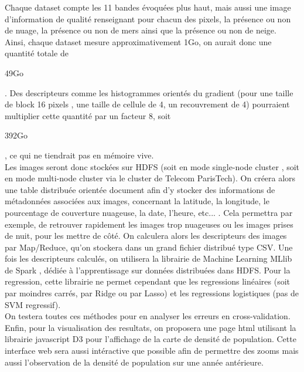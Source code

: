 \documentclass{book}
\begin{document}
Chaque dataset compte les 11 bandes évoquées plus haut, mais aussi une image d'information de 
qualité renseignant pour chacun des pixels, la présence ou non de nuage, la présence ou non de mers ainsi que la 
présence ou non de neige.\\
Ainsi, chaque dataset mesure approximativement 1Go, on aurait donc une quantité totale de \begin{bf}49Go\end{bf} . 
Des descripteurs comme les 
histogrammes orientés du gradient (pour une taille de block 16 pixels , une taille de cellule de 4, un recouvrement de 4)
pourraient multiplier cette quantité par un facteur 8, soit \begin{bf}392Go\end{bf}, ce qui ne tiendrait pas 
en mémoire vive.\\
Les images seront donc stockées sur HDFS \cite{White:2009:HDG:1717298} (soit en mode \og single-node cluster \fg{}, 
soit en mode \og multi-node cluster \fg{} via le cluster de Telecom ParisTech). On créera alors une table distribuée orientée document afin d'y 
stocker des informations de métadonnées associées aux images, concernant la latitude, la longitude, le pourcentage de couverture 
nuageuse, la date, l'heure, etc... . Cela permettra par exemple, de retrouver rapidement les images trop nuageuses ou les images prises de nuit, pour les mettre de côté.
On calculera alors les descripteurs des images par Map/Reduce, qu'on stockera dans un grand fichier distribué type CSV.
Une fois les descripteurs calculés, on utilisera la librairie de Machine Learning MLlib de Spark \cite{Meng:2016:MML:2946645.2946679}, 
dédiée à l'apprentissage sur données distribuées dans HDFS.
Pour la regression, cette librairie ne permet cependant que les regressions linéaires 
(soit par moindres carrés, par Ridge ou par Lasso) et les regressions logistiques (pas de SVM regressif).\\
On testera toutes ces méthodes pour en analyser les erreurs en cross-validation.\\
Enfin, pour la visualisation des resultats, on proposera une page html utilisant la librairie javascript 
D3 \cite{Jain:2014:DVD:2667432.2667451} pour l'affichage de la carte de densité de population. Cette interface web sera aussi
intéractive que possible afin de permettre des zooms mais aussi l'observation de la densité de population sur une année antérieure.

\clearpage

\backmatter

\listoftables

\listoffigures



\end{document}
